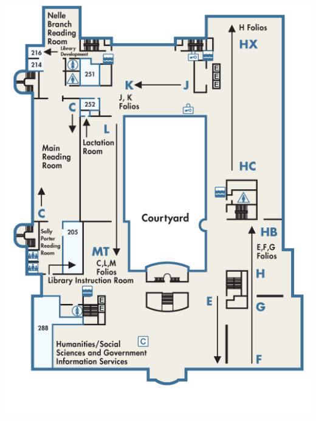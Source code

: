 \documentclass{article}
\begin{document}
\includegraphics[height=8.5in,width=11in]{map-shields-2.png}
\end{document}
